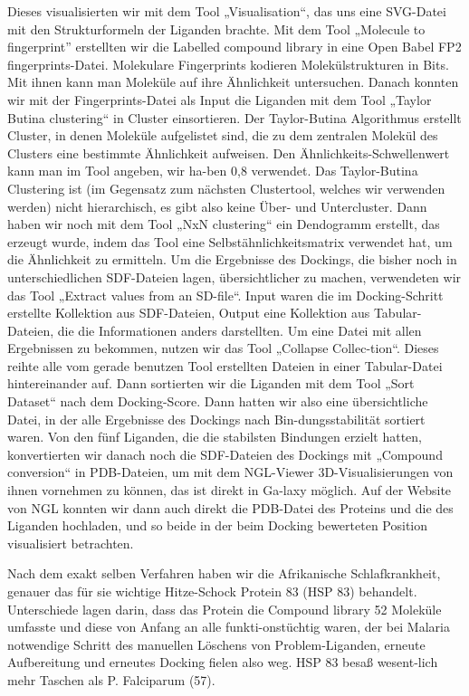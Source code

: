 \documentclass[11pt]{article}
\begin{document}
{    Dieses visualisierten wir mit dem Tool „Visualisation“, das uns eine SVG-Datei mit den Strukturformeln der Liganden brachte.
    Mit dem Tool „Molecule to fingerprint” erstellten wir die Labelled compound library in eine Open Babel FP2 fingerprints-Datei. Molekulare Fingerprints kodieren Molekülstrukturen in Bits. Mit ihnen kann man Moleküle auf ihre Ähnlichkeit untersuchen.
    Danach konnten wir mit der Fingerprints-Datei als Input die Liganden mit dem Tool „Taylor Butina clustering“ in Cluster einsortieren. Der Taylor-Butina Algorithmus erstellt Cluster, in denen Moleküle aufgelistet sind, die zu dem zentralen Molekül des Clusters eine bestimmte Ähnlichkeit aufweisen. Den Ähnlichkeits-Schwellenwert kann man im Tool angeben, wir ha-ben 0,8 verwendet. Das Taylor-Butina Clustering ist (im Gegensatz zum nächsten Clustertool, welches wir verwenden werden) nicht hierarchisch, es gibt also keine Über- und Untercluster.
    Dann haben wir noch mit dem Tool „NxN clustering“ ein Dendogramm erstellt, das erzeugt wurde, indem das Tool eine Selbstähnlichkeitsmatrix verwendet hat, um die Ähnlichkeit zu ermitteln.
    Um die Ergebnisse des Dockings, die bisher noch in unterschiedlichen SDF-Dateien lagen, übersichtlicher zu machen, verwendeten wir das Tool „Extract values from an SD-file“. Input waren die im Docking-Schritt erstellte Kollektion aus SDF-Dateien, Output eine Kollektion aus Tabular-Dateien, die die Informationen anders darstellten.
    Um eine Datei mit allen Ergebnissen zu bekommen, nutzen wir das Tool „Collapse Collec-tion“. Dieses reihte alle vom gerade benutzen Tool erstellten Dateien in einer Tabular-Datei hintereinander auf. Dann sortierten wir die Liganden mit dem Tool „Sort Dataset“ nach dem Docking-Score.
    Dann hatten wir also eine übersichtliche Datei, in der alle Ergebnisse des Dockings nach Bin-dungsstabilität sortiert waren.
    Von den fünf Liganden, die die stabilsten Bindungen erzielt hatten, konvertierten wir danach noch die SDF-Dateien des Dockings mit „Compound conversion“ in PDB-Dateien, um mit dem NGL-Viewer 3D-Visualisierungen von ihnen vornehmen zu können, das ist direkt in Ga-laxy möglich.
    Auf der Website von NGL konnten wir dann auch direkt die PDB-Datei des Proteins und die des Liganden hochladen, und so beide in der beim Docking bewerteten Position visualisiert betrachten.

    Nach dem exakt selben Verfahren haben wir die Afrikanische Schlafkrankheit, genauer das für sie wichtige Hitze-Schock Protein 83 (HSP 83) behandelt. Unterschiede lagen darin, dass das Protein die Compound library 52 Moleküle umfasste und diese von Anfang an alle funkti-onstüchtig waren, der bei Malaria notwendige Schritt des manuellen Löschens von Problem-Liganden, erneute Aufbereitung und erneutes Docking fielen also weg. HSP 83 besaß wesent-lich mehr Taschen als P. Falciparum (57).

}
\end{document}
